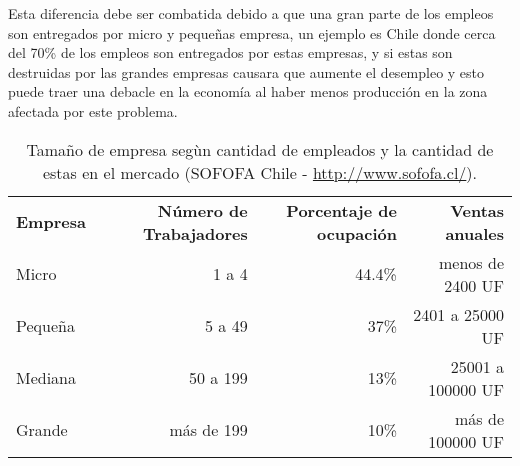 Esta diferencia debe ser combatida debido a que una gran parte de los empleos
son entregados por micro y pequeñas empresa, un ejemplo es Chile donde cerca del
70\% de los empleos son entregados por estas empresas, y si estas son destruidas
por las grandes empresas causara que aumente el desempleo y esto puede traer una
debacle en la economía al haber menos producción en la zona afectada por este
problema.


\begin{table}[h]
\centering
\begin{tabular}{lrrr}
{\bf Empresa}  & {\bf Número de Trabajadores} & {\bf Porcentaje de ocupación} & {\bf Ventas anuales}\\
Micro    & 1 a 4                & 44.4\%  & menos de 2400 UF\\
Pequeña  & 5 a 49               & 37\%  & 2401 a 25000 UF\\
Mediana  & 50 a 199             & 13\%  & 25001 a 100000 UF\\
Grande   & más de 199           & 10\%  & más de 100000 UF\\
\end{tabular}
\caption[TamañoEmpresa]{Tamaño de empresa segùn cantidad de empleados y
la cantidad de estas en el mercado (SOFOFA Chile - \url{http://www.sofofa.cl/}).}
\label{tab:tam_empresa}
\end{table}
